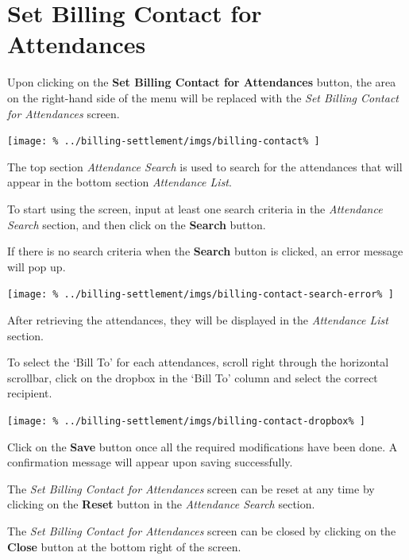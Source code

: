 \documentclass[../main/main]{subfiles}
\begin{document}
\newpage
\section{Set Billing Contact for Attendances}
\label{sec:set-billing-contact-for-attendances}

Upon clicking on the \textbf{Set Billing Contact for Attendances} button,
the area on the right-hand side of the menu will be replaced with the
\emph{Set Billing Contact for Attendances} screen.

\texttt{[image: \%
  ../billing-settlement/imgs/billing-contact\%
]}

The top section \emph{Attendance Search} is used to search for the
attendances that will appear in the bottom section \emph{Attendance List}.

To start using the screen, input at least one search criteria in the
\emph{Attendance Search} section, and then click on the \textbf{Search} button.

If there is no search criteria when the \textbf{Search} button is clicked,
an error message will pop up.

\texttt{[image: \%
  ../billing-settlement/imgs/billing-contact-search-error\%
]}

After retrieving the attendances, they will be displayed in the
\emph{Attendance List} section.

To select the `Bill To' for each attendances, scroll right through the
horizontal scrollbar, click on the dropbox in the `Bill To' column and
select the correct recipient.

\texttt{[image: \%
  ../billing-settlement/imgs/billing-contact-dropbox\%
]}

Click on the \textbf{Save} button once all the required modifications have
been done. A confirmation message will appear upon saving successfully.

The \emph{Set Billing Contact for Attendances} screen can be reset at any time
by clicking on the \textbf{Reset} button in the \emph{Attendance Search}
section.

The \emph{Set Billing Contact for Attendances} screen can be closed by clicking
on the \textbf{Close} button at the bottom right of the screen.
\end{document}
